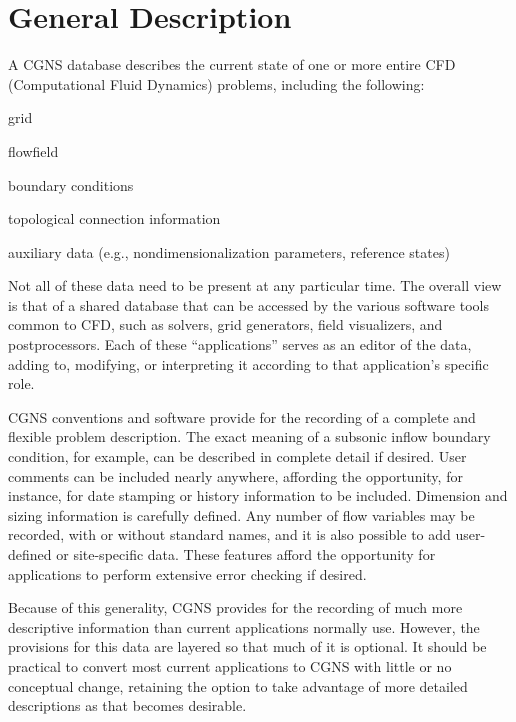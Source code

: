 \section{General Description}
\label{s:description}
\thispagestyle{plain}

A CGNS database describes the current state of one or more entire CFD
(Computational Fluid Dynamics) problems, including the following:

\begin{itemize*}
   \item grid
   \item flowfield
   \item boundary conditions
   \item topological connection information
   \item auxiliary data (e.g., nondimensionalization parameters,
         reference states)
\end{itemize*}

Not all of these data need to be present at any particular time.
The overall view is that of a shared database that can be accessed
by the various software tools common to CFD, such as solvers, grid
generators, field visualizers, and postprocessors.
Each of these ``applications'' serves as an editor of the data, adding to,
modifying, or interpreting it according to that application's specific
role.

CGNS conventions and software provide for the recording of a complete
and flexible problem description.
The exact meaning of a subsonic inflow boundary condition, for example,
can be described in complete detail if desired.
User comments can be included nearly anywhere, affording the
opportunity, for instance, for date stamping or history information to
be included.
Dimension and sizing information is carefully defined.
Any number of flow variables may be recorded, with or without standard
names, and it is also possible to add user-defined or site-specific
data.
These features afford the opportunity for applications to perform
extensive error checking if desired.

Because of this generality, CGNS provides for the recording of much more
descriptive information than current applications normally use.
However, the provisions for this data are layered so that much of it is
optional.
It should be practical to convert most current applications to CGNS with
little or no conceptual change, retaining the option to take advantage
of more detailed descriptions as that becomes desirable.

